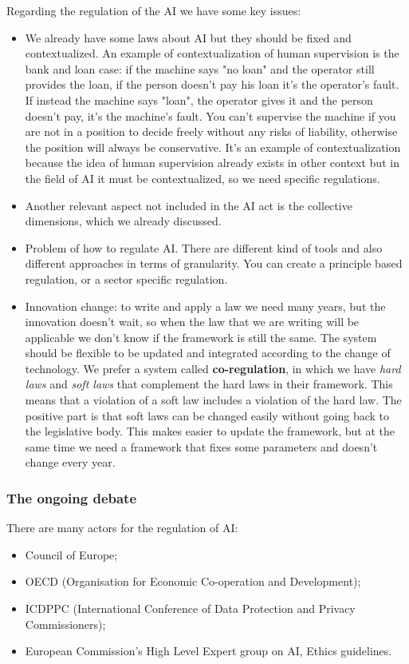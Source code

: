 Regarding the regulation of the AI we have some key issues:
\begin{itemize}
    \item We already have some laws about AI but they should be fixed and contextualized. An example of contextualization of human supervision is the bank and loan case: if the machine says "no loan" and the operator still provides the loan, if the person doesn't pay his loan it's the operator's fault. If instead the machine says "loan", the operator gives it and the person doesn't pay, it's the machine's fault. You can't supervise the machine if you are not in a position to decide freely without any risks of liability, otherwise the position will always be conservative. 
    It's an example of contextualization because the idea of human supervision already exists in other context but in the field of AI it must be contextualized, so we need specific regulations.
    \item Another relevant aspect not included in the AI act is the collective dimensions, which we already discussed.
    \item Problem of how to regulate AI. There are different kind of tools and also different approaches in terms of granularity. You can create a principle based regulation, or a sector specific regulation. 
    \item Innovation change: to write and apply a law we need many years, but the innovation doesn't wait, so when the law that we are writing will be applicable we don't know if the framework is still the same. The system should be flexible to be updated and integrated according to the change of technology. We prefer a system called \textbf{co-regulation}, in which we have \textit{hard laws} and \textit{soft laws} that complement the hard laws in their framework. This means that a violation of a soft law includes a violation of the hard law. The positive part is that soft laws can be changed easily without going back to the legislative body. This makes easier to update the framework, but at the same time we need a framework that fixes some parameters and doesn't change every year.
\end{itemize}
\subsubsection{The ongoing debate}
There are many actors for the regulation of AI:
\begin{itemize}
    \item Council of Europe;
    \item OECD (Organisation for Economic Co-operation and Development);
    \item ICDPPC (International Conference of Data Protection and Privacy Commissioners);
    \item European Commission's High Level Expert group on AI, Ethics guidelines. 
\end{itemize}

